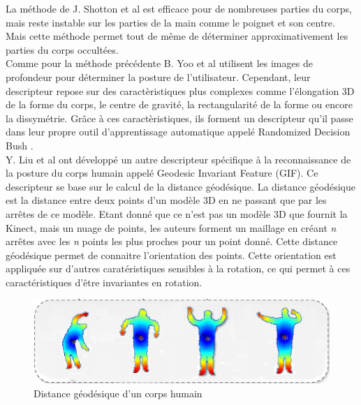La méthode de J. Shotton et al\cite{kinectSegmentation} est efficace pour de nombreuses parties du corps, 
mais reste instable sur les parties de la main comme le poignet et son centre. Mais cette méthode permet 
tout de même de déterminer approximativement les parties du corps occultées.\\

Comme pour la méthode précédente B. Yoo et al\cite{RDB} utilisent les images de profondeur pour déterminer
la posture de l'utilisateur. Cependant, leur descripteur repose sur des caractèristiques plus complexes comme
l'élongation 3D de la forme du corps, le centre de gravité, la rectangularité de la forme ou encore la 
dissymétrie. Grâce à ces caractèristiques, ils forment un descripteur qu'il passe dans leur propre outil
d'apprentissage automatique appelé \og Randomized Decision Bush \fg.\\

Y. Liu et al\cite{GIF} ont développé un autre descripteur spécifique à la reconnaissance de la posture du corps
humain appelé \og Geodesic Invariant Feature \fg(GIF). 
Ce descripteur se base sur le calcul de la distance géodésique. La distance géodésique est la distance
entre deux points d'un modèle 3D en ne passant que par les arrêtes de ce modèle. Etant donné que ce n'est pas un
modèle 3D que fournit la Kinect, mais un nuage de points, les auteurs forment un maillage en créant \textit{n} arrêtes avec
les \textit{n} points les plus proches pour un point donné. Cette distance géodésique permet de connaitre l'orientation
des points. Cette orientation est appliquée sur d'autres caratéristiques sensibles à la rotation, ce qui permet
à ces caractéristiques d'être invariantes en rotation. 

\begin{figure}[!ht]
  \begin{center}
    \includegraphics[width=12cm]{image/geodesic.png}
    \caption{Distance géodésique d'un corps humain}
  \end{center}
\end{figure}

